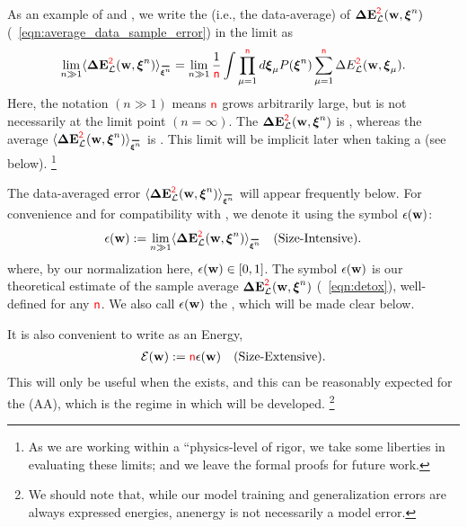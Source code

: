 As an example of \SizeExtensivity and \SizeIntensivity, 
we write the \ExpectedValue (i.e., the data-average) of \DataSampleError $\mathbf{\Delta {E}}^{{\color{red}\sf{2}}}_{\mathcal{L}}(\mathbf{w}, \boldsymbol{\xi}^{n})$ (\EQN~\ref{eqn:average_data_sample_error})
in the \LargeN limit as
\begin{align}
  \lim_{n\gg 1} 
  \langle \DETOPXI\rangle_{\AVGNDXIn}=
  \lim_{n\gg 1}\frac{1}{\ND}
\int \prod_{\mu=1}^{\ND}d\XI_{\mu}P(\NDXIn)
  \sum_{\mu=1}^{\ND}\DEL(\WVEC,\XI_{\mu}) .
\end{align}
Here, the notation $(n \gg 1)$ means ${\color{red}\sf{n}}$ grows arbitrarily large, but is not necessarily
at the limit point $(n=\infty)$.
The \TotalDataSampleError $\mathbf{\Delta {E}}^{{\color{red}\sf{2}}}_{\mathcal{L}}(\mathbf{w}, \boldsymbol{\xi}^{n})$ is \SizeExtensive, whereas the
average $\langle\DETOPXI\rangle_{\AVGNDXIn}$ is \SizeIntensive.
This limit will be implicit later when taking a \SaddlePointApproximation (see below).
\footnote{As we are working within a ``physics-level of rigor, we take some liberties in evaluating these \LargeN limits; and we leave the formal proofs for future work.  }

The data-averaged error  $\langle \DETOPXI \rangle_{\AVGNDXIn}$ will appear frequently below.
For convenience and for compatibility with \cite{SST92}, we denote it using the symbol $\epsilon({\mathbf{w}})$:
\begin{align}
 \label{eqn:epsl}
 \EPSLw:=\lim_{n\gg 1}  \langle \DETOPXI \rangle_{\AVGNDXIn} \quad \text{(\SizeIntensive)}.
\end{align}
where, by our normalization here, $\epsilon({\mathbf{w}}) \in [0,1]$.
The symbol $\epsilon({\mathbf{w}})$ is our theoretical estimate of the sample average $\mathbf{\Delta {E}}^{{\color{red}\sf{2}}}_{\mathcal{L}}(\mathbf{w}, \boldsymbol{\xi}^{n})$ (\EQN~\ref{eqn:detox}),
well-defined for any ${\color{red}\sf{n}}$.
We also call $\epsilon({\mathbf{w}})$ the \emph{\EffectivePotential}, which will be made clear below.

It is also convenient to write \emph{\TotalEffectivePotential} as an Energy, 
\begin{align}
 \label{eqn:detox}
 \mathcal{E}(\mathbf{w}) := {\color{red}\sf{n}}\epsilon({\mathbf{w}})\quad \text{(Size-Extensive)}.
\end{align}
This will only be useful when the \ThermodynamicLimit exists, and this
can be reasonably expected for the \AnnealedApproximation (AA),
which is the regime in which \SETOL will be developed.%
\footnote{We should note that, while our model training and generalization errors are always expressed energies, anenergy is not necessarily a model error. }


